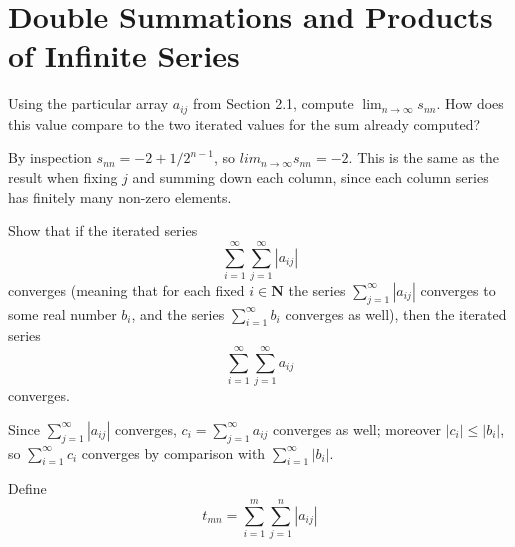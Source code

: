 \section{Double Summations and Products of Infinite Series}

\begin{exercise}
    Using the particular array \(a_{ij}\) from Section 2.1, compute \(\lim_{n \to \infty} s_{nn}\). How does this value compare to the two iterated values for the
sum already computed?
\end{exercise}

\begin{solution}
By inspection \(s_{nn} = -2 + 1/2^{n - 1}\), so \(lim_{n \to \infty} s_{nn} = -2\). This is the same as the result when fixing \(j\) and summing down each column, since each column series has finitely many non-zero elements.
\end{solution}

\begin{exercise}
    Show that if the iterated series
    \[ \sum^\infty_{i = 1} \sum^\infty_{j=1} \left| a_{ij} \right| \]
    converges (meaning that for each fixed \(i \in \mathbf{N}\) the series \(\sum^\infty_{j=1}|a_{ij}|\) converges to some real number \(b_i\), and the series \(\sum^\infty_{i=1}b_i\) converges as well), then the iterated series
    \[\sum^\infty_{i=1} \sum^\infty_{j=1} a_{ij}\]
    converges.
\end{exercise}

\begin{solution}
    Since \(\sum^\infty_{j=1}|a_{ij}|\) converges, \(c_i = \sum^\infty_{j=1}a_{ij}\) converges as well; moreover \(|c_i| \leq |b_i|\), so \(\sum^\infty_{i=1}c_i\) converges by comparison with \(\sum^\infty_{i=1}|b_i|\).
\end{solution}

\begin{exercise}
Define
\[
    t_{mn}=  \sum^m_{i=1}\sum^n_{j=1}|a_{ij}|
\]
\end{exercise}

